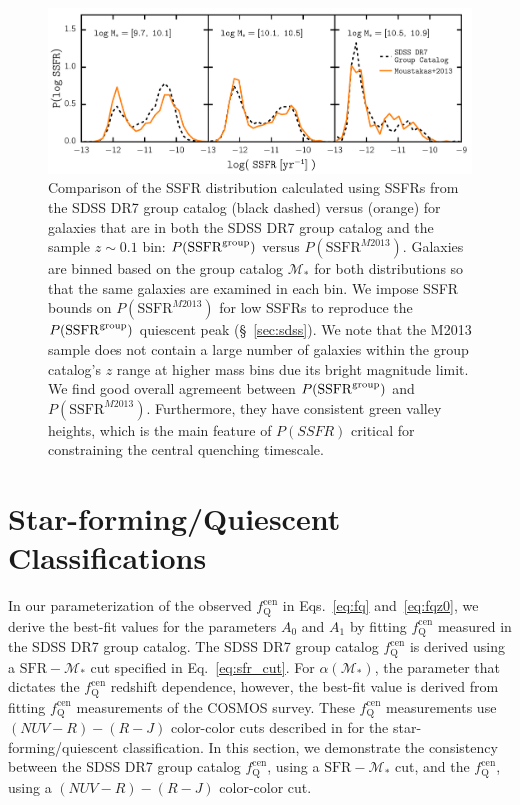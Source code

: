 \documentclass[iop,apj,tighten,twocolappendix,numberedappendix]{emulateapj}
\newcommand{\fqcen}{f_\mathrm{Q}^\mathrm{cen}}
\begin{document}
\begin{figure}
\begin{center}
\includegraphics[scale=0.5]{figs/Pssfr_comparison.pdf}
\caption{
Comparison of the SSFR distribution calculated using 
SSFRs from the SDSS DR7 group catalog (black dashed) versus
\cite{Moustakas:2013aa} (orange) for galaxies that are in 
both the SDSS DR7 group catalog and the \cite{Moustakas:2013aa} 
sample $z\sim0.1$ bin: $P(\mathrm{SSFR}^{\rm group})$ versus 
$P(\mathrm{SSFR}^{M2013})$. Galaxies are binned based on the
group catalog $\mathcal{M}_*$ for both distributions so that 
the same galaxies are examined in each bin. We impose SSFR 
bounds on $P(\mathrm{SSFR}^{M2013})$ for low SSFRs to reproduce 
the $P(\mathrm{SSFR}^{\rm group})$ quiescent peak (\S~\ref{sec:sdss}). 
We note that the M2013 sample does not contain a large number 
of galaxies within the group catalog's $z$ range at higher 
mass bins due its bright magnitude limit.
We find good overall agremeent between $P(\mathrm{SSFR}^{\rm group})$ 
and $P(\mathrm{SSFR}^{M2013})$. Furthermore, they have consistent 
green valley heights, which is the main feature of $P(SSFR)$ critical 
for constraining the central quenching timescale.
}
\label{fig:Pssfr_comp}
\end{center}
\end{figure}

\section{Star-forming/Quiescent Classifications} \label{app:sfq}
In our parameterization of the observed $\fqcen$ in Eqs.~\ref{eq:fq} and~\ref{eq:fqz0}, 
we derive the best-fit values for the parameters $A_0$ and $A_1$ by fitting 
$\fqcen$ measured in the SDSS DR7 group catalog. The SDSS DR7 group catalog 
$\fqcen$ is derived using a $\mathrm{SFR} - \mathcal{M}_*$ cut 
specified in Eq.~\ref{eq:sfr_cut}. For $\alpha(\mathcal{M}_*)$, the 
parameter that dictates the $\fqcen$ redshift dependence, however, 
the best-fit value is derived from fitting \cite{Tinker:2013aa} 
$\fqcen$ measurements of the COSMOS survey. These $\fqcen$ measurements 
use $(NUV - R) - (R - J)$ color-color cuts described in 
\cite{Bundy:2010aa} for the star-forming/quiescent classification. 
In this section, we demonstrate the consistency between the SDSS 
DR7 group catalog $\fqcen$, using a $\mathrm{SFR} - \mathcal{M}_*$ 
cut, and the \cite{Tinker:2013aa} $\fqcen$, using a $(NUV - R) - (R - J)$ 
color-color cut.
\end{document}
